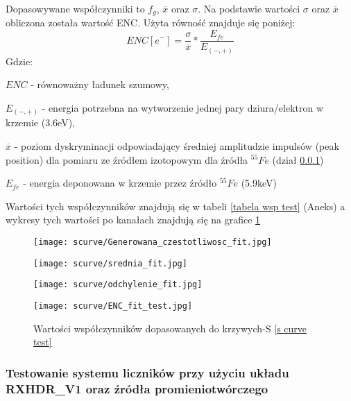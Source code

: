 Dopasowywane współczynniki to $f_g$, $\overline{x}$ oraz $\sigma$. Na podstawie wartości $\sigma$ oraz $\overline{x}$ obliczona została wartość ENC. Użyta równość znajduje się poniżej:
\begin{equation}
        ENC [e^-] = \frac{\sigma}{\overline{x}} * \frac{E_{fe}}{E_{(-,+)}}
\end{equation}
Gdzie:
\begin{description}
        \item $ENC$  - równoważny ładunek szumowy,
        \item $E_{(-,+)}$ - energia potrzebna na wytworzenie jednej pary dziura/elektron w krzemie (3.6eV),
        \item $\overline{x}$ - poziom dyskryminacji odpowiadający średniej amplitudzie impulsów (peak position) dla pomiaru ze źródłem izotopowym dla źródła ${}^{55}Fe$ (dział \ref{section RXHDR fe})
        \item $E_{fe}$ -  energia deponowana w krzemie przez źródło ${}^{55}Fe$  (5.9keV)
\end{description}

Wartości tych współczynników znajdują się w tabeli \ref{tabela wsp test} (Aneks) a wykresy tych wartości po kanałach znajdują się na grafice \ref{test fit wsp wyk} 

\begin{figure}[b]
        \begin{multicols}{2}
                \texttt{[image: scurve/Generowana\_czestotliwosc\_fit.jpg]} \par
                \texttt{[image: scurve/srednia\_fit.jpg]} \par       
        \end{multicols} \hfill
        \begin{multicols}{2}
                \texttt{[image: scurve/odchylenie\_fit.jpg]} \par
                \texttt{[image: scurve/ENC\_fit\_test.jpg]} \par
        \end{multicols}
        \caption{Wartości współczynników dopasowanych do krzywych-S \ref{s curve test}}
        \label{test fit wsp wyk}
\end{figure}





\subsubsection{Testowanie systemu liczników przy użyciu układu RXHDR\_V1 oraz źródła promieniotwórczego}
\label{section RXHDR fe}

